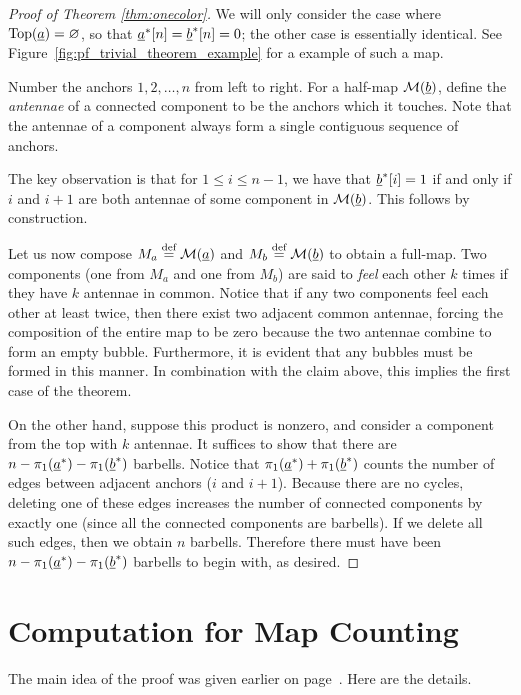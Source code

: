 \onecolor*
\begin{proof}[Proof of Theorem \ref{thm:onecolor}]
	We will only consider the case where $\operatorname{Top}(\underline{a}) = \varnothing$, so that $\underline{a}^\ast[n] = \underline{b}^\ast[n] = 0$; the other case is essentially identical.  See Figure~\ref{fig:pf_trivial_theorem_example} for a example of such a map.

	Number the anchors $1,2,\dots,n$ from left to right.  For a half-map $\mathcal M(\underline{b})$, define the \emph{antennae} of a connected component to be the anchors which it touches.  Note that the antennae of a component always form a single contiguous sequence of anchors.

	The key observation is that for $1 \le i \le n-1$, we have that $\underline{b}^\ast[i] = 1$ if and only if $i$ and $i+1$ are both antennae of some component in $\mathcal M(\underline{b})$.  This follows by construction.

	Let us now compose $M_a \stackrel{\text{def}}{=} \mathcal M(\underline{a})$ and $M_b \stackrel{\text{def}}{=} \mathcal M(\underline{b})$ to obtain a full-map.  Two components (one from $M_a$ and one from $M_b$) are said to \emph{feel} each other $k$ times if they have $k$ antennae in common.  Notice that if any two components feel each other at least twice, then there exist two adjacent common antennae, forcing the composition of the entire map to be zero because the two antennae combine to form an empty bubble.  Furthermore, it is evident that any bubbles must be formed in this manner.  In combination with the claim above, this implies the first case of the theorem.

	On the other hand, suppose this product is nonzero, and consider a component from the top with $k$ antennae.  It suffices to show that there are $n - \pi_1(\underline{a}^\ast) - \pi_1(\underline{b}^\ast)$ barbells.  Notice that $\pi_1(\underline{a}^\ast) + \pi_1(\underline{b}^\ast)$ counts the number of edges between adjacent anchors ($i$ and $i+1$).  Because there are no cycles, deleting one of these edges increases the number of connected components by exactly one (since all the connected components are barbells).  If we delete all such edges, then we obtain $n$ barbells.  Therefore there must have been $n - \pi_1(\underline{a}^\ast) - \pi_1(\underline{b}^\ast)$ barbells to begin with, as desired.
\end{proof}

\section{Computation for Map Counting}
\label{sec:count_map_computation}
\countmaps*
The main idea of the proof was given earlier on page~\pageref{thm:count_maps}.  Here are the details.

